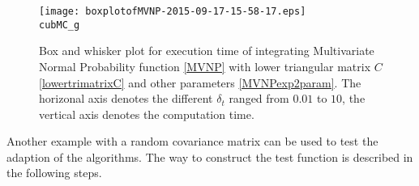 \documentclass{iitthesis}
\theoremstyle{definition}
\begin{document}
%


\begin{figure}
\centering
 \texttt{[image: boxplotofMVNP-2015-09-17-15-58-17.eps]} \\ {\tt cubMC\_g} 
\caption{Box and whisker plot for execution time of integrating Multivariate Normal Probability function \eqref{MVNP} with lower triangular matrix $C$ \eqref{lowertrimatrixC} and other parameters \eqref{MVNPexp2param}. The horizonal axis denotes the different $\delta_t$ ranged from $0.01$ to $10$, the vertical axis denotes the computation time. \label{fig:MVNPadaptivitiy} }
\end{figure}
Another example with a random covariance matrix can be used to test the adaption of the algorithms. The way to construct the test function is described in the following steps. 
\end{document}
